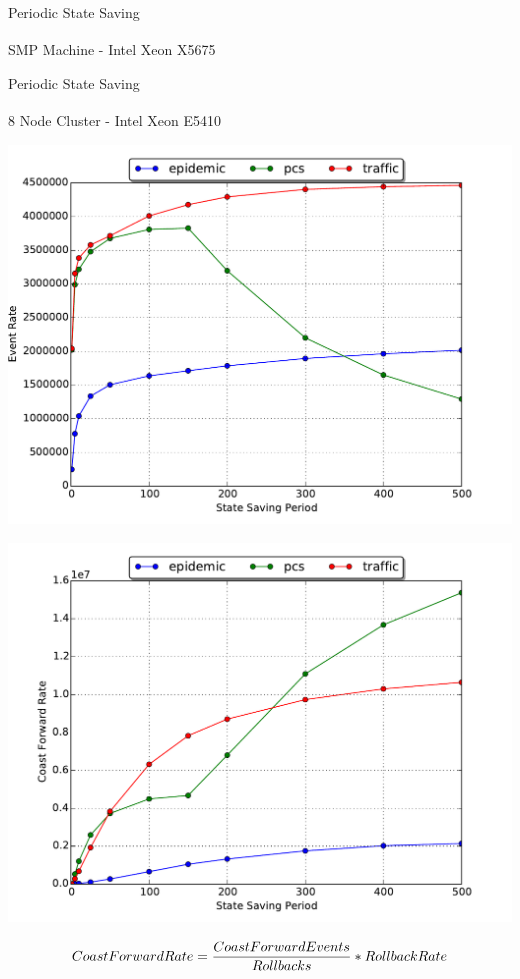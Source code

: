 \documentclass[10pt]{beamer}
\begin{document}
\begin{frame}{Periodic State Saving}
\begin{block}{SMP Machine - Intel\textsuperscript{\textregistered} Xeon\textsuperscript{\textregistered} X5675}
\begin{minipage}{0.5\textwidth}
        \end{minipage}
    \end{block}
\end{frame}

\begin{frame}{Periodic State Saving}
    \begin{block}{8 Node Cluster - Intel\textsuperscript{\textregistered} Xeon\textsuperscript{\textregistered} E5410}
        \smallskip
        \begin{minipage}{0.5\textwidth}
            \includegraphics[width=\textwidth]{../figs/state_saving/beowulf/eventrate_500.pdf}
        \end{minipage}%
        \begin{minipage}{0.5\textwidth}
            \includegraphics[width=\textwidth]{../figs/state_saving/beowulf/cf_rate_500.pdf}
        \end{minipage}
    $$ CoastForwardRate = {CoastForwardEvents \over Rollbacks} * RollbackRate $$
    \end{block}
\end{frame}
\end{document}
